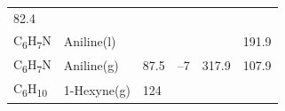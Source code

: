 \documentclass[
  9pt,
]{extbook}
\theoremstyle{definition}
\theoremstyle{definition}
\theoremstyle{definition}
\theoremstyle{remark}
\begin{document}
\begin{longtable}[]{@{}llllll@{}}
\begin{minipage}[t]{0.14\columnwidth}
82.4\strut
\end{minipage}\tabularnewline
\begin{minipage}[t]{0.07\columnwidth}\raggedright
C\textsubscript{6}H\textsubscript{7}N\strut
\end{minipage} & \begin{minipage}[t]{0.17\columnwidth}\raggedright
Aniline(l)\strut
\end{minipage} & \begin{minipage}[t]{0.15\columnwidth}\raggedright
\strut
\end{minipage} & \begin{minipage}[t]{0.15\columnwidth}\raggedright
\strut
\end{minipage} & \begin{minipage}[t]{0.14\columnwidth}\raggedright
\strut
\end{minipage} & \begin{minipage}[t]{0.14\columnwidth}\raggedright
191.9\strut
\end{minipage}\tabularnewline
\begin{minipage}[t]{0.07\columnwidth}\raggedright
C\textsubscript{6}H\textsubscript{7}N\strut
\end{minipage} & \begin{minipage}[t]{0.17\columnwidth}\raggedright
Aniline(g)\strut
\end{minipage} & \begin{minipage}[t]{0.15\columnwidth}\raggedright
87.5\strut
\end{minipage} & \begin{minipage}[t]{0.15\columnwidth}\raggedright
--7\strut
\end{minipage} & \begin{minipage}[t]{0.14\columnwidth}\raggedright
317.9\strut
\end{minipage} & \begin{minipage}[t]{0.14\columnwidth}\raggedright
107.9\strut
\end{minipage}\tabularnewline
\begin{minipage}[t]{0.07\columnwidth}\raggedright
C\textsubscript{6}H\textsubscript{10}\strut
\end{minipage} & \begin{minipage}[t]{0.17\columnwidth}\raggedright
1-Hexyne(g)\strut
\end{minipage} & \begin{minipage}[t]{0.15\columnwidth}\raggedright
124\strut
\end{minipage} & \begin{minipage}[t]{0.15\columnwidth}\raggedright

\end{minipage}
\end{longtable}
\end{document}
